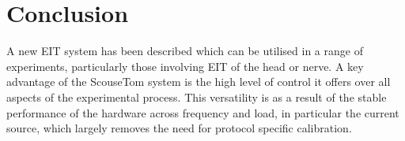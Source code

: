 \section{Conclusion}
A new EIT system has been described which can be utilised in a range of experiments, particularly those involving EIT of the head or nerve. A key advantage of the ScouseTom system is the high level of control it offers over all aspects of the experimental process. This versatility is as a result of the stable performance of the hardware across frequency and load, in particular the current source, which largely removes the need for protocol specific calibration. 
